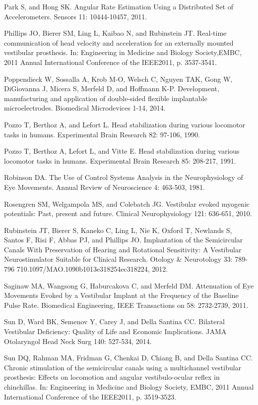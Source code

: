{Park S, and Hong SK. Angular Rate Estimation Using a Distributed Set of Accelerometers. Sensors 11: 10444-10457, 2011.

Phillips JO, Bierer SM, Ling L, Kaibao N, and Rubinstein JT. Real-time communication of head velocity and acceleration for an externally mounted vestibular prosthesis. In: Engineering in Medicine and Biology Society,EMBC, 2011 Annual International Conference of the IEEE2011, p. 3537-3541.

Poppendieck W, Sossalla A, Krob M-O, Welsch C, Nguyen TAK, Gong W, DiGiovanna J, Micera S, Merfeld D, and Hoffmann K-P. Development, manufacturing and application of double-sided flexible implantable microelectrodes. Biomedical Microdevices 1-14, 2014.

Pozzo T, Berthoz A, and Lefort L. Head stabilization during various locomotor tasks in humans. Experimental Brain Research 82: 97-106, 1990.

Pozzo T, Berthoz A, Lefort L, and Vitte E. Head stabilization during various locomotor tasks in humans. Experimental Brain Research 85: 208-217, 1991.

Robinson DA. The Use of Control Systems Analysis in the Neurophysiology of Eye Movements. Annual Review of Neuroscience 4: 463-503, 1981.

Rosengren SM, Welgampola MS, and Colebatch JG. Vestibular evoked myogenic potentials: Past, present and future. Clinical Neurophysiology 121: 636-651, 2010.

Rubinstein JT, Bierer S, Kaneko C, Ling L, Nie K, Oxford T, Newlands S, Santos F, Risi F, Abbas PJ, and Phillips JO. Implantation of the Semicircular Canals With Preservation of Hearing and Rotational Sensitivity: A Vestibular Neurostimulator Suitable for Clinical Research. Otology \& Neurotology 33: 789-796 710.1097/MAO.1090b1013e318254ec318224, 2012.

Saginaw MA, Wangsong G, Haburcakova C, and Merfeld DM. Attenuation of Eye Movements Evoked by a Vestibular Implant at the Frequency of the Baseline Pulse Rate. Biomedical Engineering, IEEE Transactions on 58: 2732-2739, 2011.

Sun D, Ward BK, Semenov Y, Carey J, and Della Santina CC. Bilateral Vestibular Deficiency: Quality of Life and Economic Implications. JAMA Otolaryngol Head Neck Surg 140: 527-534, 2014.

Sun DQ, Rahman MA, Fridman G, Chenkai D, Chiang B, and Della Santina CC. Chronic stimulation of the semicircular canals using a multichannel vestibular prosthesis: Effects on locomotion and angular vestibulo-ocular reflex in chinchillas. In: Engineering in Medicine and Biology Society, EMBC, 2011 Annual International Conference of the IEEE2011, p. 3519-3523.

}
